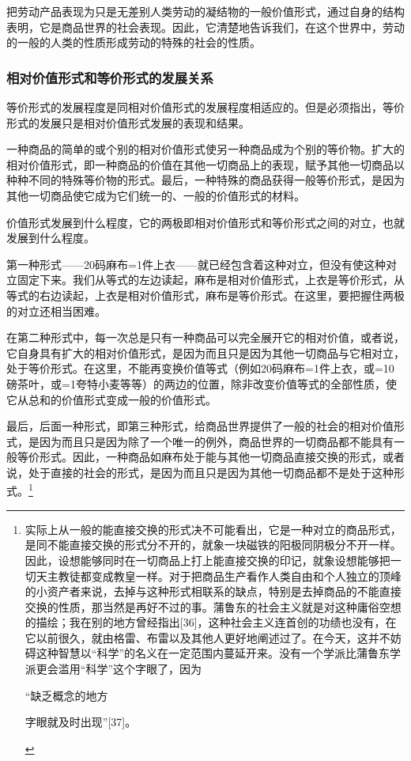 \documentclass{ctexbook}
\begin{document}
            把劳动产品表现为只是无差别人类劳动的凝结物的一般价值形式，通过自身的结构表明，它是商品世界的社会表现。因此，它清楚地告诉我们，在这个世界中，劳动的一般的人类的性质形成劳动的特殊的社会的性质。

            \subsubsection{相对价值形式和等价形式的发展关系}

            等价形式的发展程度是同相对价值形式的发展程度相适应的。但是必须指出，等价形式的发展只是相对价值形式发展的表现和结果。
            
            一种商品的简单的或个别的相对价值形式使另一种商品成为个别的等价物。扩大的相对价值形式，即一种商品的价值在其他一切商品上的表现，赋予其他一切商品以种种不同的特殊等价物的形式。最后，一种特殊的商品获得一般等价形式，是因为其他一切商品使它成为它们统一的、一般的价值形式的材料。
            
            价值形式发展到什么程度，它的两极即相对价值形式和等价形式之间的对立，也就发展到什么程度。
            
            第一种形式——20码麻布=1件上衣——就已经包含着这种对立，但没有使这种对立固定下来。我们从等式的左边读起，麻布是相对价值形式，上衣是等价形式，从等式的右边读起，上衣是相对价值形式，麻布是等价形式。在这里，要把握住两极的对立还相当困难。
            
            在第二种形式中，每一次总是只有一种商品可以完全展开它的相对价值，或者说，它自身具有扩大的相对价值形式，是因为而且只是因为其他一切商品与它相对立，处于等价形式。在这里，不能再变换价值等式（例如20码麻布=1件上衣，或=10磅茶叶，或=1夸特小麦等等）的两边的位置，除非改变价值等式的全部性质，使它从总和的价值形式变成一般的价值形式。
            
            最后，后面一种形式，即第三种形式，给商品世界提供了一般的社会的相对价值形式，是因为而且只是因为除了一个唯一的例外，商品世界的一切商品都不能具有一般等价形式。因此，一种商品如麻布处于能与其他一切商品直接交换的形式，或者说，处于直接的社会的形式，是因为而且只是因为其他一切商品都不是处于这种形式。\footnote{实际上从一般的能直接交换的形式决不可能看出，它是一种对立的商品形式，是同不能直接交换的形式分不开的，就象一块磁铁的阳极同阴极分不开一样。因此，设想能够同时在一切商品上打上能直接交换的印记，就象设想能够把一切天主教徒都变成教皇一样。对于把商品生产看作人类自由和个人独立的顶峰的小资产者来说，去掉与这种形式相联系的缺点，特别是去掉商品的不能直接交换的性质，那当然是再好不过的事。蒲鲁东的社会主义就是对这种庸俗空想的描绘；我在别的地方曾经指出[36]，这种社会主义连首创的功绩也没有，在它以前很久，就由格雷、布雷以及其他人更好地阐述过了。在今天，这并不妨碍这种智慧以“科学”的名义在一定范围内蔓延开来。没有一个学派比蒲鲁东学派更会滥用“科学”这个字眼了，因为
            \begin{center}
                “缺乏概念的地方
            
                字眼就及时出现”[37]。
            \end{center}
            }
            
\end{document}
